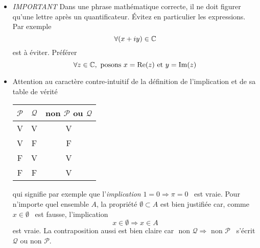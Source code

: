 \begin{itemize}
  
  \item \emph{IMPORTANT} Dans une phrase mathématique correcte, il ne doit figurer qu'une lettre après un quantificateur. \'Evitez en particulier les expressions. Par exemple
\begin{displaymath}
 \forall (x+iy) \in \mathbb{C}
\end{displaymath}
est à éviter. Préférer
\begin{displaymath}
 \forall z \in \mathbb{C},\text{ posons } x=\mathop{\mathrm{Re}}(z)\text{ et } y=\mathop{\mathrm{Im}}(z)
\end{displaymath}
  
  \item Attention au caractère contre-intuitif de la définition de l'implication et de sa table de vérité \bigskip 
\begin{center} 
 \begin{tabular}{|c|c|c|}
\hline
$\mathcal{P}$ & $\mathcal{Q}$ & non $\mathcal{P}$ ou $\mathcal{Q}$ \\ \hline
V             & V             &   V  \\ \hline
V             & F             &   F  \\ \hline
F             & V             &   V  \\ \hline
F             & F             &   V  \\ \hline
 \end{tabular}   
\end{center}\bigskip
qui signifie par exemple que l'\emph{implication} \og $1 = 0 \Rightarrow \pi =0$\fg~ est vraie.\newline
Pour n'importe quel ensemble $A$, la propriété $\emptyset \subset A$ est bien justifiée car, comme \og$x\in \emptyset$\fg~ est fausse, l'implication
\begin{displaymath}
  x\in \emptyset \Rightarrow x\in A
\end{displaymath}
est vraie.\newline
La contraposition  aussi est bien claire car \og $\text{ non } \mathcal{Q} \Rightarrow \text{ non } \mathcal{P}$\fg~ s'écrit
\og $\mathcal{Q}$ ou non $\mathcal{P}$\fg.
\end{itemize}

